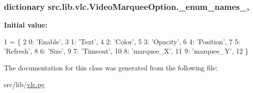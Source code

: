 \subsubsection[{\+\_\+enum\+\_\+names\+\_\+}]{\setlength{\rightskip}{0pt plus 5cm}dictionary src.\+lib.\+vlc.\+Video\+Marquee\+Option.\+\_\+enum\+\_\+names\+\_\+\hspace{0.3cm}{\ttfamily [static]}, {\ttfamily [private]}}\label{classsrc_1_1lib_1_1vlc_1_1VideoMarqueeOption_a211a7ad22269a5ebbdd3a7883077ff3e}
{\bfseries Initial value\+:}
\begin{DoxyCode}
1 = \{
2         0: \textcolor{stringliteral}{'Enable'},
3         1: \textcolor{stringliteral}{'Text'},
4         2: \textcolor{stringliteral}{'Color'},
5         3: \textcolor{stringliteral}{'Opacity'},
6         4: \textcolor{stringliteral}{'Position'},
7         5: \textcolor{stringliteral}{'Refresh'},
8         6: \textcolor{stringliteral}{'Size'},
9         7: \textcolor{stringliteral}{'Timeout'},
10         8: \textcolor{stringliteral}{'marquee\_X'},
11         9: \textcolor{stringliteral}{'marquee\_Y'},
12     \}
\end{DoxyCode}


The documentation for this class was generated from the following file\+:\begin{DoxyCompactItemize}
\item 
src/lib/\hyperlink{vlc_8py}{vlc.\+py}\end{DoxyCompactItemize}
